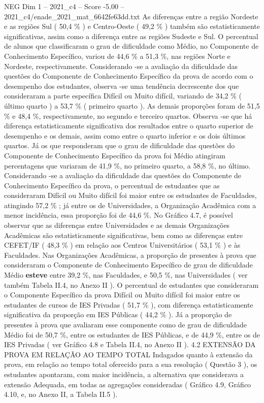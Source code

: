 \begin{textsample}{NEG Dim 1 – 2021\_c4 – Score -5.00 – 2021\_c4/enade\_2021\_mat\_6642fe63dd.txt}
As diferenças entre a região Nordeste e as regiões Sul ( 50,4 \% ) e Centro-Oeste ( 49,2 \% ) também são estatisticamente significativas, assim como a diferença entre as regiões Sudeste e Sul.
O percentual de alunos que classificaram o grau de dificuldade como Médio, no Componente de Conhecimento Específico, variou de 44,6 \% a 51,3 \%, nas regiões Norte e Nordeste, respectivamente.
Considerando -se a avaliação da dificuldade das questões do Componente de Conhecimento Específico da prova de acordo com o desempenho dos estudantes, observa -se uma tendência decrescente dos que consideraram a parte específica Difícil ou Muito difícil, variando de 34,2 \% ( último quarto ) a 53,7 \% ( primeiro quarto ).
As demais proporções foram de 51,5 \% e 48,4 \%, respectivamente, no segundo e terceiro quartos.
Observa -se que há diferença estatisticamente significativa dos resultados entre o quarto superior de desempenho e os demais, assim como entre o quarto inferior e os dois últimos quartos.
Já os que responderam que o grau de dificuldade das questões do Componente de Conhecimento Específico da prova foi Médio atingiram percentagens que variaram de 41,9 \%, no primeiro quarto, a 58,8 \%, no último.
Considerando -se a avaliação da dificuldade das questões do Componente de Conhecimento Específico da prova, o percentual de estudantes que as consideraram Difícil ou Muito difícil foi maior entre os estudantes de Faculdades, atingindo 57,2 \% ; já entre os de Universidades, a Organização Acadêmica com a menor incidência, essa proporção foi de 44,6 \%.
No Gráfico 4.7, é possível observar que as diferenças entre Universidades e as demais Organizações Acadêmicas são estatisticamente significativas, bem como as diferenças entre CEFET/IF ( 48,3 \% ) em relação aos Centros Universitários ( 53,1 \% ) e às Faculdades.
Nas Organizações Acadêmicas, a proporção de presentes à prova que consideraram o Componente de Conhecimento Específico de grau de dificuldade Médio \textbf{esteve} entre 39,2 \%, nas Faculdades, e 50,5 \%, nas Universidades ( ver também Tabela II.4, no Anexo II ).
O percentual de estudantes que consideraram o Componente Específico da prova Difícil ou Muito difícil foi maior entre os estudantes de cursos de IES Privadas ( 51,7 \% ), com diferença estatisticamente significativa da proporção em IES Públicas ( 44,2 \% ).
Já a proporção de presentes à prova que avaliaram esse componente como de grau de dificuldade Médio foi de 50,7 \%, entre os estudantes de IES Públicas, e de 44,9 \%, entre os de IES Privadas ( ver Gráfico 4.8 e Tabela II.4, no Anexo II ). 4.2 EXTENSÃO DA PROVA EM RELAÇÃO AO TEMPO TOTAL Indagados quanto à extensão da prova, em relação ao tempo total oferecido para a sua resolução ( Questão 3 ), os estudantes apontaram, com maior incidência, a alternativa que considerava a extensão Adequada, em todas as agregações consideradas ( Gráfico 4.9, Gráfico 4.10, e, no Anexo II, a Tabela II.5 ).

\end{textsample}
